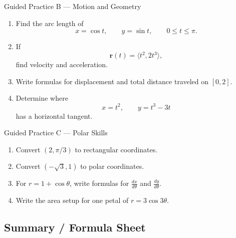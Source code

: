 \documentclass[11pt]{article}
\newcommand{\vect}[1]{\mathbf{#1}}
\begin{document}
\begin{practicebox}{Guided Practice B --- Motion and Geometry}
\begin{enumerate}
    \item Find the arc length of
    \[
    x=\cos t,\qquad y=\sin t,\qquad 0\le t\le \pi.
    \]
    \item If
    \[
    \vect{r}(t)=\langle t^2,2t^3\rangle,
    \]
    find velocity and acceleration.
    \item Write formulas for displacement and total distance traveled on \([0,2]\).
    \item Determine where
    \[
    x=t^2,\qquad y=t^3-3t
    \]
    has a horizontal tangent.
\end{enumerate}
\end{practicebox}

\begin{practicebox}{Guided Practice C --- Polar Skills}
\begin{enumerate}
    \item Convert \((2,\pi/3)\) to rectangular coordinates.
    \item Convert \((-\sqrt3,1)\) to polar coordinates.
    \item For \(r=1+\cos\theta\), write formulas for \(\frac{dx}{d\theta}\) and \(\frac{dy}{d\theta}\).
    \item Write the area setup for one petal of \(r=3\cos3\theta\).
\end{enumerate}
\end{practicebox}

\newpage
\subsection{Summary / Formula Sheet}
\end{document}
